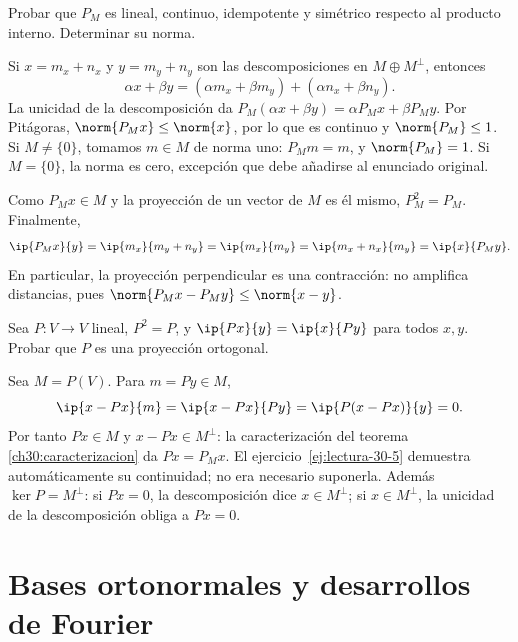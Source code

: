 \begin{ejercicio}\label{ej:lectura-30-5}
Probar que $P_M$ es lineal, continuo, idempotente y simétrico respecto al producto interno. Determinar su norma.
\end{ejercicio}
\begin{solucion}
Si $x=m_x+n_x$ y $y=m_y+n_y$ son las descomposiciones en $M\oplus M^{\perp}$, entonces
\[
 \alpha x+\beta y=(\alpha m_x+\beta m_y)+(\alpha n_x+\beta n_y).
\]
La unicidad de la descomposición da $P_M(\alpha x+\beta y)=\alpha P_Mx+\beta P_My$. Por Pitágoras, $\norm{P_Mx}\leq\norm{x}$, por lo que es continuo y $\norm{P_M}\leq1$. Si $M\ne\{0\}$, tomamos $m\in M$ de norma uno: $P_Mm=m$, y $\norm{P_M}=1$. Si $M=\{0\}$, la norma es cero, excepción que debe añadirse al enunciado original.

Como $P_Mx\in M$ y la proyección de un vector de $M$ es él mismo, $P_M^{2}=P_M$. Finalmente,
\[
 \ip{P_Mx}{y}=\ip{m_x}{m_y+n_y}=\ip{m_x}{m_y}
 =\ip{m_x+n_x}{m_y}=\ip{x}{P_My}.
\]
En particular, la proyección perpendicular es una contracción: no amplifica distancias, pues $\norm{P_Mx-P_My}\leq\norm{x-y}$.
\end{solucion}

\begin{ejercicio}\label{ej:lectura-30-6}
Sea $P:V\to V$ lineal, $P^{2}=P$, y $\ip{Px}{y}=\ip{x}{Py}$ para todos $x,y$. Probar que $P$ es una proyección ortogonal.
\end{ejercicio}
\begin{solucion}
Sea $M=P(V)$. Para $m=Py\in M$,
\[
 \ip{x-Px}{m}=\ip{x-Px}{Py}=\ip{P(x-Px)}{y}=0.
\]
Por tanto $Px\in M$ y $x-Px\in M^{\perp}$: la caracterización del teorema \ref{ch30:caracterizacion} da $Px=P_Mx$. El ejercicio~\ref{ej:lectura-30-5} demuestra automáticamente su continuidad; no era necesario suponerla. Además $\ker P=M^{\perp}$: si $Px=0$, la descomposición dice $x\in M^{\perp}$; si $x\in M^{\perp}$, la unicidad de la descomposición obliga a $Px=0$.
\end{solucion}

\chapter{Bases ortonormales y desarrollos de Fourier}

